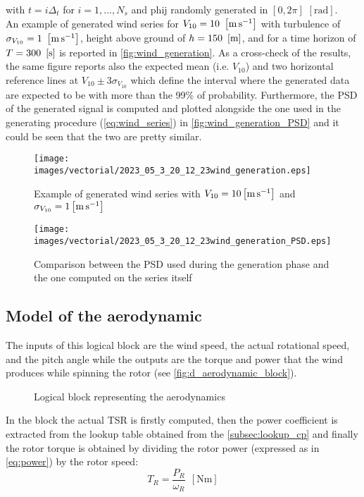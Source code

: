 with $t = i\Delta_t$ for $i=1,\dots,N_s$ and \acrshort{phij} randomly generated in $ \left[0, 2\pi\right]$ $\left[\si{\radian}\right]$. \\
An example of generated wind series for $V_{10}=10 \ \left[\si{\meter\per\second}\right]$ with turbulence of $\sigma_{V_{10}}=1 \ \mesunt{\meter\per\second}$, height above ground of $h=150 
 \ \left[\si{\meter}\right]$, and for a time horizon of $T = 300 \ \left[\si{\second}\right]$ is reported in \autoref{fig:wind_generation}. As a cross-check of the results, the same figure reports also the expected mean (i.e. $V_{10}$) and two horizontal reference lines at $V_{10}\pm3\sigma_{V_{10}}$ which define the interval where the generated data are expected to be with more than the 99\% of probability. Furthermore, the PSD of the generated signal is computed and plotted alongside the one used in the generating procedure (\autoref{eq:wind_series}) in \autoref{fig:wind_generation_PSD} and it could be seen that the two are pretty similar. 
\begin{figure}[htb]
    \centering
    \texttt{[image: images/vectorial/2023\_05\_3\_20\_12\_23wind\_generation.eps]}
    \caption{Example of generated wind series with $V_{10}=10\left[\si{\meter\per\second}\right]$ and $\sigma_{V_{10}}=1\left[\si{\meter\per\second}\right]$ }
    \label{fig:wind_generation}
\end{figure}

\begin{figure}[htb]
    \centering
    \texttt{[image: images/vectorial/2023\_05\_3\_20\_12\_23wind\_generation\_PSD.eps]}
    \caption{Comparison between the PSD used during the generation phase and the one computed on the series itself}
    \label{fig:wind_generation_PSD}
\end{figure}

\subsection[Aerodynamic]{Model of the aerodynamic}
The inputs of this logical block are the wind speed, the actual rotational speed, and the pitch angle while the outputs are the torque and power that the wind produces while spinning the rotor (see \autoref{fig:d_aerodynamic_block}). 
\begin{figure}
  \centering
  
  \caption{Logical block representing the aerodynamics}
  \label{fig:d_aerodynamic_block}
\end{figure}

In the block the actual \acrshort{TSR} is firstly computed, then the power coefficient is extracted from the lookup table obtained from the \autoref{subsec:lookup_cp} and finally the rotor torque is obtained by dividing the rotor power (expressed as in \autoref{eq:power}) by the rotor speed:
\begin{equation}
    T_R = \frac{P_R}{\omega_R} \ \ \left[\si{\newton\meter}\right]
\end{equation}

